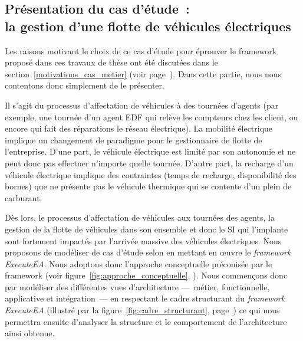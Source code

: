     \subsection{Présentation du cas d'étude~:\\la gestion d'une flotte de véhicules électriques}

    Les raisons motivant le choix de ce cas d'étude pour éprouver le framework
    proposé dans ces travaux de thèse ont été discutées dans le
    section~\ref{motivations_cas_metier} (voir
    page~\pageref{motivations_cas_metier}).  Dans cette partie, nous nous
    contentons donc simplement de le présenter.

    Il s'agit du processus d'affectation de véhicules à des tournées d'agents
    (par exemple, une tournée d'un agent EDF qui relève les compteurs chez les
    client, ou encore qui fait des réparations le réseau électrique).  La
    mobilité électrique implique un changement de paradigme pour le gestionnaire
    de flotte de l'entreprise. D'une part, le véhicule électrique est limité par
    son autonomie et ne peut donc pas effectuer n'importe quelle tournée.
    D'autre part, la recharge d'un véhicule électrique implique des contraintes
    (temps de recharge, disponibilité des bornes) que ne présente pas le
    véhicule thermique qui se contente d'un plein de carburant.
    
    Dès lors, le processus d'affectation de véhicules aux tournées des agents,
    la gestion de la flotte de véhicules dans son ensemble et donc le SI qui
    l'implante sont fortement impactés par l'arrivée massive des véhicules
    électriques. Nous proposons de modéliser de cas d'étude selon en mettant en
    œuvre le \emph{framework ExecuteEA}. Nous adoptons donc l'approche
    conceptuelle préconisée par le framework (voir
    figure~\ref{fig:approche_conceptuelle},
    \pageref{fig:approche_conceptuelle}). Nous commençons donc par modéliser des
    différentes vues d'architecture —~métier, fonctionnelle, applicative et
    intégration~— en respectant le cadre structurant du \emph{framework
    ExecuteEA} (illustré par la figure~\ref{fig:cadre_structurant},
    page~\pageref{fig:cadre_structurant}) ce qui nous permettra ensuite
    d'analyser la structure et le comportement de l'architecture ainsi obtenue.

